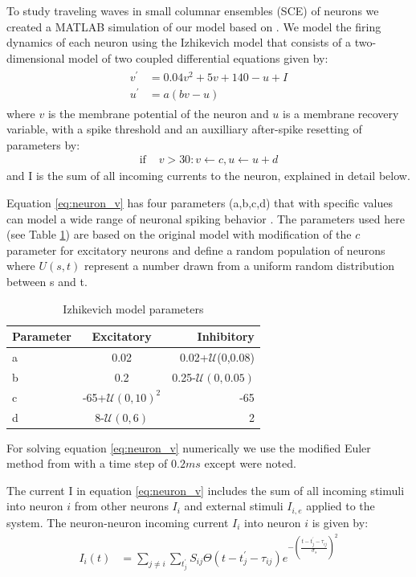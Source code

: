 To study traveling waves in small columnar ensembles (SCE) of neurons we created a MATLAB simulation of our model based on \citet{izhikevich2003}.
We model the firing dynamics of each neuron using the Izhikevich model \citep{izhikevich2003} that consists of a two-dimensional model of two coupled differential equations given by:
\begin{align}
 \begin{split}
  v^\prime &= 0.04v^2+5v+140-u+I \label{eq:neuron_v} \\
  u^\prime &= a(bv-u)
 \end{split}
\end{align}
where $v$ is the membrane potential of the neuron and $u$ is a membrane recovery variable, with a spike threshold and an auxilliary after-spike resetting of parameters by:
\begin{align}
  \text{if } &v>30: v\leftarrow c, u\leftarrow u+d
\end{align}
and I is the sum of all incoming currents to the neuron, explained in detail below. 

Equation \ref{eq:neuron_v} has four parameters (a,b,c,d) that with specific values can model a wide range of neuronal spiking behavior \citep{izhikevich2003}. 
The parameters used here (see Table \ref{tab:izzy_params}) are based on the original model with modification of the $c$ parameter for excitatory neurons and define a random population of neurons where $U(s,t)$ represent a number drawn from a uniform random distribution between s and t. 
\begin{table}[!htb]
 \caption{Izhikevich model parameters}
 \label{tab:izzy_params}
 \centering
 \begin{tabular}{lcr}
  \textbf{Parameter} & \textbf{Excitatory} & \textbf{Inhibitory} \\
  \hline
  a & 0.02 & 0.02+$\mathcal{U}$(0,0.08) \\
  b & 0.2 & 0.25-$\mathcal{U}(0,0.05)$\\
  c & -65+$\mathcal{U}(0,10)^2$ & -65 \\
  d & 8-$\mathcal{U}(0,6)$& 2 \\
 \end{tabular}
\end{table}
For solving equation \ref{eq:neuron_v} numerically we use the modified Euler method from \citet{izhikevich2003} with a time step of $0.2 ms$ except were noted. 

The current I in equation \ref{eq:neuron_v} includes the sum of all incoming stimuli into neuron $i$ from other neurons $I_i$ and external stimuli $I_{i,e}$ applied to the system. 
The neuron-neuron incoming current $I_i$ into neuron $i$ is given by:
\begin{align}
 I_i(t) &= \sum_{j\ne i} \sum_{t^\prime_j} S_{ij}  \Theta(t-t^\prime_j-\tau_{ij})e^{-(\frac{t-t^\prime_j-\tau_{ij}}{\sigma_s})^2}
\end{align}

